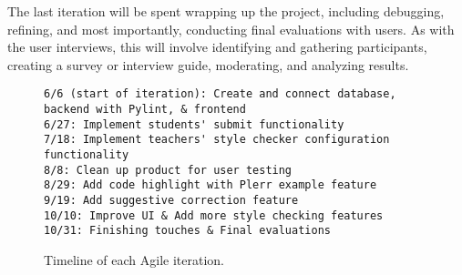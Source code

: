 \documentclass[10pt,twocolumn]{article}
\begin{document}
The last iteration will be spent wrapping up the project, including debugging, refining, and most importantly, conducting final evaluations with users. As with the user interviews, this will involve identifying and gathering participants, creating a survey or interview guide, moderating, and analyzing results. 

\begin{figure}
\begin{lstlisting}
6/6 (start of iteration): Create and connect database, backend with Pylint, & frontend
6/27: Implement students' submit functionality
7/18: Implement teachers' style checker configuration functionality
8/8: Clean up product for user testing
8/29: Add code highlight with Plerr example feature
9/19: Add suggestive correction feature
10/10: Improve UI & Add more style checking features
10/31: Finishing touches & Final evaluations
\end{lstlisting}
    \vspace{7 mm}
	\centering
	\caption{Timeline of each Agile iteration.}
\end{figure}


\printbibliography 
\end{document}
